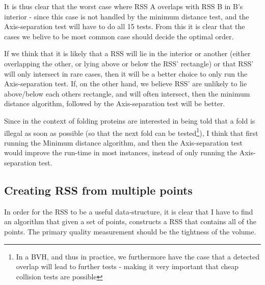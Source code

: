 It is thus clear that the worst case where RSS A overlaps with RSS B in B's interior - since this case is not handled by the minimum distance test, and the Axis-separation test will have to do all 15 tests. From this it is clear that the cases we belive to be most common case should decide the optimal order. 

If we think that it is likely that a RSS will lie in the interior or another (either overlapping the other, or lying above or below the RSS' rectangle) or that RSS' will only intersect in rare cases, then it will be a better choice to only run the Axis-separation test. If, on the other hand, we believe RSS' are unlikely to lie above/below each others rectangle, and will often intersect, then the minimum distance algorithm, followed by the Axis-separation test will be better.

Since in the context of folding proteins are interested in being told that a fold is illegal as soon as possible (so that the next fold can be tested\footnote{In a BVH, and thus in practice, we furthermore have the case that a detected overlap will lead to further tests - making it very important that cheap collision tests are possible}), I think that first running the Minimum distance algorithm, and then the Axis-separation test would improve the run-time in most instances, instead of only running the Axis-separation test.

\subsection{Creating RSS from multiple points}
In order for the RSS to be a useful data-structure, it is clear that I have to find an algorithm that given a set of points, constructs a RSS that contains all of the points. The primary quality measurement should be the tightness of the volume.

